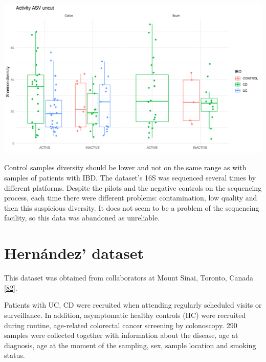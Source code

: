 \documentclass[
  12pt,
  a4paper,
  twoside,
  openright]{book}
\let\origfigure\figure
\let\endorigfigure\endfigure
\renewenvironment{figure}[1][2] {
    \expandafter\origfigure\expandafter[!htp]
} {
    \endorigfigure
}
\begin{document}
\begin{figure}
\includegraphics[width=1\linewidth]{images/barcelona-diversity} \caption[Diversity indices of Barcelona according to the location and disease status.]{Diversity indices of Barcelona according to the location and disease status. There is a lot of diversity between different groups but importantly the control samples overlap with the patients with inflammatory bowel disease.}\label{fig:barcelona-diversity}
\end{figure}

Control samples diversity should be lower and not on the same range as with samples of patients with IBD.
The dataset's 16S was sequenced several times by different platforms.
Despite the pilots and the negative controls on the sequencing process, each time there were different problems: contamination, low quality and then this suspicious diversity.
It does not seem to be a problem of the sequencing facility, so this data was abandoned as unreliable.

\hypertarget{hernandez}{%
\section{Hernández' dataset}\label{hernandez}}

This dataset was obtained from collaborators at Mount Sinai, Toronto, Canada {[}\protect\hyperlink{ref-hernuxe1ndez-rocha2021}{82}{]}.

Patients with UC, CD were recruited when attending regularly scheduled visits or surveillance.
In addition, asymptomatic healthy controls (HC) were recruited during routine, age-related colorectal cancer screening by colonoscopy.
290 samples were collected together with information about the disease, age at diagnosis, age at the moment of the sampling, sex, sample location and smoking status.
\end{document}
